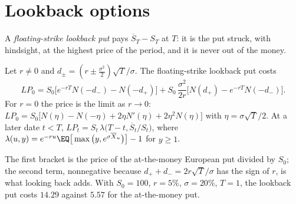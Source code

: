 
\section{Lookback options}\label{sec:exo-lookback}

A \emph{floating-strike lookback put} pays $\overline S_T-S_T$ at $T$: it is the put struck, with
hindsight, at the highest price of the period, and it is never out of the money.

\begin{proposition}\label{prop:exo-lookback}
Let $r\ne0$ and $d_\pm=(r\pm\frac{\sigma^2}2)\sqrt T/\sigma$. The floating-strike lookback put
costs
\[
  LP_0=S_0\Big[e^{-rT}N(-d_-)-N(-d_+)\Big]+S_0\,\frac{\sigma^2}{2r}\Big[N(d_+)-e^{-rT}N(-d_-)\Big].
\]
For $r=0$ the price is the limit as $r\to0$:
$LP_0=S_0\big[N(\eta)-N(-\eta)+2\eta N'(\eta)+2\eta^2N(\eta)\big]$ with $\eta=\sigma\sqrt T/2$. At a
later date $t<T$, $LP_t=S_t\,\lambda\big(T-t,\overline S_t/S_t\big)$, where
$\lambda(u,y)=e^{-ru}\EQ\big[\max\big(y,e^{\sigma\overline X_u}\big)\big]-1$ for $y\ge1$.
\end{proposition}

The first bracket is the price of the at-the-money European put divided by $S_0$; the second
term, nonnegative because $d_++d_-=2r\sqrt T/\sigma$ has the sign of $r$, is what looking back
adds. With $S_0=100$, $r=5\%$, $\sigma=20\%$, $T=1$, the lookback put costs $14.29$ against $5.57$
for the at-the-money put.

